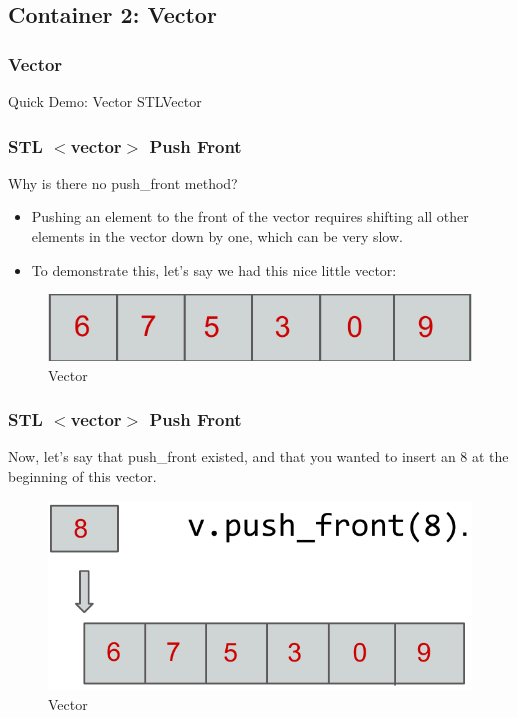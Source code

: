 \documentclass{beamer}
\newtheorem{Key points}{Key points}
\begin{document}
\subsection{Container 2: Vector}
\begin{frame}
  \frametitle{Vector}
  \begin{center}
    \Huge{Quick Demo: Vector STLVector}
  \end{center}
\end{frame}
\begin{frame}
  \frametitle{STL $<$vector$>$ Push Front}
  Why is there no push\_front method?
  \begin{itemize}
  \item Pushing an element to the front of the vector
requires shifting all other elements in the vector
down by one, which can be very slow.
\item To demonstrate this, let's say we had this nice
little vector:
  \end{itemize}
  \begin{figure}
    \centering
         \includegraphics[width=0.7\columnwidth]{vec1.png}
    \caption{Vector}
  \end{figure}

\end{frame}

\begin{frame}
  \frametitle{STL $<$vector$>$ Push Front}
  Now, let's say that push\_front existed, and
 that you wanted to insert an 8 at the beginning
 of this vector.

  \begin{figure}
    \centering
         \includegraphics[width=0.7\columnwidth]{vec2.png}
    \caption{Vector}
  \end{figure}

\end{frame}
\end{document}
